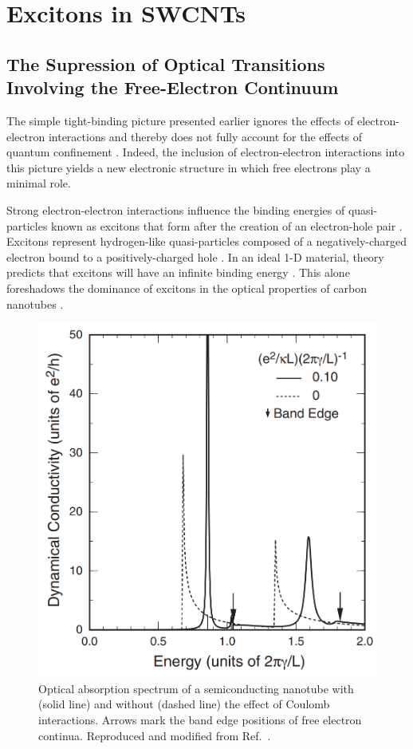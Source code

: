 \section{Excitons in SWCNTs}

\subsection{The Supression of Optical Transitions Involving the Free-Electron Continuum}
The simple tight-binding picture presented earlier ignores the effects of electron-electron interactions and thereby does not fully account for the effects of quantum confinement \cite{weismanKonoBook}. Indeed, the inclusion of electron-electron interactions into this picture yields a new electronic structure in which free electrons play a minimal role.

Strong electron-electron interactions influence the binding energies of quasi-particles known as excitons that form after the creation of an electron-hole pair \cite{koch2006semiconductor}. Excitons represent hydrogen-like quasi-particles composed of a negatively-charged electron bound to a positively-charged hole \cite{koch2006semiconductor}. In an ideal 1-D material, theory predicts that excitons will have an infinite binding energy \cite{ando2005theory}. This alone foreshadows the dominance of excitons in the optical properties of carbon nanotubes \cite{ando2005theory}. 

\begin{figure}[h]
	\centering
	\includegraphics[scale=0.35]{images/chapter_optical_props/ando_suppression}
	\caption{Optical absorption spectrum of a semiconducting nanotube with (solid line) and without (dashed line) the effect of Coulomb interactions. Arrows mark the band edge positions of free electron continua. Reproduced and modified from Ref.\ \cite{ando2005theory}.}
	\label{fig:ando_suppression}
\end{figure}

